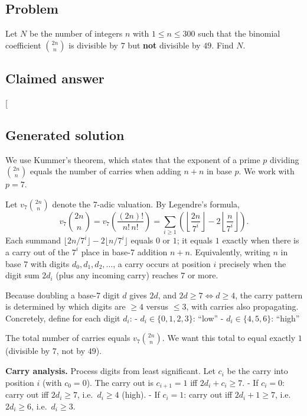 \documentclass[
  11pt,
  letterpaper,
]{article}
\begin{document}
\subsection{Problem}\label{problem-4}

Let \(N\) be the number of integers \(n\) with \(1 \le n \le 300\) such
that the binomial coefficient \(\binom{2n}{n}\) is divisible by \(7\)
but \textbf{not} divisible by \(49\). Find \(N\).

\subsection{Claimed answer}\label{claimed-answer-4}

{[}\boxed{105}{]}

\subsection{Generated solution}\label{generated-solution-4}

We use Kummer's theorem, which states that the exponent of a prime \(p\)
dividing \(\binom{2n}{n}\) equals the number of carries when adding
\(n+n\) in base \(p\). We work with \(p=7\).

Let \(v_7\binom{2n}{n}\) denote the 7-adic valuation. By Legendre's
formula,
\[v_7\binom{2n}{n} = v_7\left(\frac{(2n)!}{n!\,n!}\right) = \sum_{i\ge 1}\left(\left\lfloor \frac{2n}{7^i}\right\rfloor - 2\left\lfloor \frac{n}{7^i}\right\rfloor\right).\]
Each summand \(\lfloor 2n/7^i\rfloor - 2\lfloor n/7^i\rfloor\) equals
\(0\) or \(1\); it equals \(1\) exactly when there is a carry out of the
\(7^i\) place in base-7 addition \(n+n\). Equivalently, writing \(n\) in
base \(7\) with digits \(d_0, d_1, d_2,\dots\), a carry occurs at
position \(i\) precisely when the digit sum \(2d_i\) (plus any incoming
carry) reaches \(7\) or more.

Because doubling a base-7 digit \(d\) gives \(2d\), and
\(2d \ge 7 \iff d \ge 4\), the carry pattern is determined by which
digits are \(\ge 4\) versus \(\le 3\), with carries also propagating.
Concretely, define for each digit \(d_i\): - \(d_i \in \{0,1,2,3\}\):
``low'' - \(d_i \in \{4,5,6\}\): ``high''

The total number of carries equals \(v_7\binom{2n}{n}\). We want this
total to equal exactly \(1\) (divisible by \(7\), not by \(49\)).

\textbf{Carry analysis.} Process digits from least significant. Let
\(c_i\) be the carry into position \(i\) (with \(c_0=0\)). The carry out
is \(c_{i+1}=1\) iff \(2d_i + c_i \ge 7\). - If \(c_i=0\): carry out iff
\(2d_i \ge 7\), i.e.~\(d_i\ge 4\) (high). - If \(c_i=1\): carry out iff
\(2d_i+1\ge 7\), i.e.~\(2d_i\ge 6\), i.e.~\(d_i \ge 3\).
\end{document}
